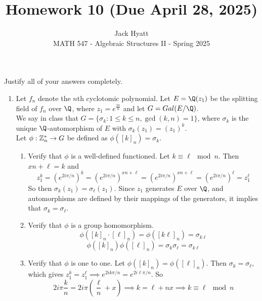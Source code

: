 \documentclass[12pt]{article}
\begin{document}
	
	
	
	\title{Homework 10 (Due April 28, 2025)}
	\author{Jack Hyatt\\ %
		MATH 547 - Algebraic Structures II - Spring 2025} 
	
	\maketitle
	
	Justify all of your answers completely.\\
	
	
	\medskip 
	
	
	\begin{enumerate}
		\item Let $f_n$ denote the $n$th cyclotomic polynomial. Let $E = \Q(z_1)$ be the splitting field of $f_n$ over $\Q$, where $z_1 = e^{\frac{2\pi}{n}}$ and let $G = Gal(E/\Q)$.\\
		We say in class that $G = \{ \sigma_k : 1 \leq k \leq n, \gcd(k,n) = 1\}$, where $\sigma_k$ is the unique $\Q$-automorphism of $E$ with $\sigma_k(z_1) = (z_1)^k$.\\
		Let $\phi : \mathbb{Z}^*_n \rightarrow G$ be defined as $\phi([k]_n) = \sigma_k$.
		\begin{enumerate}
			\item Verify that $\phi$ is a well-defined functioned.\m
			Let $k \equiv \ell \mod n$. Then $xn + \ell = k$ and
			\[z^k_1 = (e^{2i\pi/n})^k = (e^{2i\pi/n})^{xn + \ell} = (e^{2i\pi/n})^{xn + \ell} = (e^{2i\pi/n})^\ell = z^\ell_1\]
			So then $\sigma_k(z_1) = \sigma_\ell(z_1)$. Since $z_1$ generates $E$ over $\Q$, and automorphisms are defined by their mappings of the generators, it implies that $\sigma_k = \sigma_\ell$.
			
			\item Verify that $\phi$ is a group homomorphism.\m
			\[\phi([k]_n \cdot [\ell]_n) = \phi([k\ell]_n) = \sigma_{k\ell} \]
			\[\phi([k]_n)\phi([\ell]_n) = \sigma_k \sigma_\ell = \sigma_{k\ell}\]
			
			\item Verify that $\phi$ is one to one.\m
			Let $\phi([k]_n) = \phi([\ell]_n)$. Then $\sigma_k = \sigma_\ell$, which gives $z^k_1 = z^\ell_1 \implies e^{2ik\pi/n} = e^{2i\ell\pi/n}$. So
			\[2i\pi\frac{k}{n} = 2i\pi\left(\frac{\ell}{n}+x\right) \implies k = \ell +nx \implies k \equiv \ell \mod n\]
			

\end{enumerate}
\end{enumerate}
\end{document}
